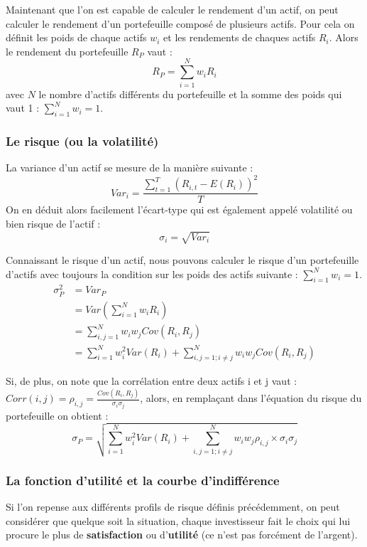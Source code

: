 Maintenant que l'on est capable de calculer le rendement d'un actif, on peut calculer le rendement d'un portefeuille composé de plusieurs actifs. Pour cela on définit les poids de chaque actifs $w_i$ et les rendements de chaques actifs $R_i$. Alors le rendement du portefeuille $R_P$ vaut :
\[ R_P = \sum_{i=1}^{N}w_iR_i\]
avec $N$ le nombre d'actifs différents du portefeuille et la somme des poids qui vaut 1 : \(\sum_{i=1}^{N}w_i =1\).

\subsubsection{Le risque (ou la volatilité)}
La variance d'un actif se mesure de la manière suivante :
\[Var_{i} = \frac{\sum_{t=1}^T (R_{i,t} - E(R_i))^2}{T} \]
On en déduit alors facilement l'écart-type qui est également appelé volatilité ou bien risque de l'actif :
\[\sigma_i = \sqrt{Var_i}\]

Connaissant le risque d'un actif, nous pouvons calculer le risque d'un portefeuille d'actifs avec toujours la condition sur les poids des actifs suivante : $\sum_{i=1}^{N} w_i = 1$.
\begin{equation}
 \begin{split}
  \sigma_P^2 & = Var_{P} \\
	   & = Var(\sum_{i=1}^N w_iR_i)\\
	   & = \sum_{i,j=1}^N w_i w_j Cov(R_i,R_j)\\
	   & = \sum_{i=1}^N w_i^2 Var(R_i) + \sum_{i,j=1; i \ne j}^N w_i w_j Cov(R_i,R_j)
 \end{split}
\end{equation}

Si, de plus, on note que la corrélation entre deux actifs i et j vaut : $Corr(i,j) = \rho_{i,j} = \frac{Cov(R_i,R_j)}{\sigma_i \sigma_j}$,
alors, en remplaçant dans l'équation du risque du portefeuille on obtient :
\[\sigma_P =  \sqrt{ \sum_{i=1}^N w_i^2 Var(R_i) + \sum_{i,j=1; i \ne j}^N w_i w_j \rho_{i,j} \times \sigma_i \sigma_j }\]

\subsubsection{La fonction d'utilité et la courbe d'indifférence}
Si l'on repense aux différents profils de risque définis précédemment, on peut considérer que quelque soit la situation, chaque investisseur fait le choix qui lui procure le plus de \textbf{satisfaction} ou d'\textbf{utilité} (ce n'est pas forcément de l'argent).\\

